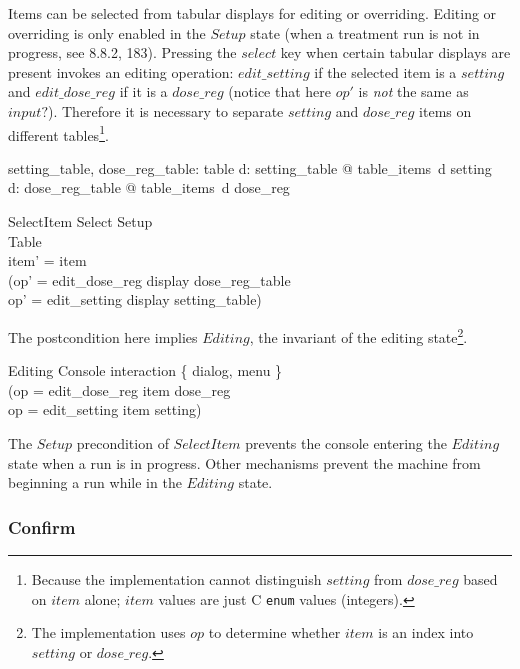 Items can be selected from tabular displays for editing or overriding.
Editing or overriding is only enabled in the $Setup$ state (when a
treatment run is not in progress, see 8.8.2, 183).  Pressing the
$select$ key when certain tabular displays are present invokes an
editing operation: $edit\_setting$ if the selected item is a $setting$
and $edit\_dose\_reg$ if it is a $dose\_reg$ (notice that here $op'$ is
{\em not} the same as $input?$).  Therefore it is necessary to
separate $setting$ and $dose\_reg$ items on different
tables\footnote{Because the implementation cannot distinguish
$setting$ from $dose\_reg$ based on $item$ alone; $item$ values are
just C {\tt enum} values (integers).}.

\begin{axdef}
	setting\_table, dose\_reg\_table: \power table
\where
	\forall d: setting\_table @ table\_items~d \subseteq setting \\
	\forall d: dose\_reg\_table @ table\_items~d \subseteq dose\_reg \\
\end{axdef}

\begin{schema}{SelectItem}
	Select
\where
	Setup \\
	Table \\
	item' = item \\
	(op' = edit\_dose\_reg \land display \in dose\_reg\_table \lor \\
	op' = edit\_setting \land display \in setting\_table)
\end{schema}
The postcondition here implies $Editing$, the invariant of the editing
state\footnote{The implementation uses $op$ to determine whether
$item$ is an index into $setting$ or $dose\_reg$.}.

\begin{schema}{Editing}
	Console
\where
	interaction \in \{ dialog, menu \} \\
	(op = edit\_dose\_reg \land item \in dose\_reg \lor \\
	op = edit\_setting \land item \in setting)
\end{schema}
The $Setup$ precondition of $SelectItem$ prevents the console entering
the $Editing$ state when a run is in progress.  Other mechanisms
prevent the machine from beginning a run while in the $Editing$ state.

\subsubsection{Confirm}


